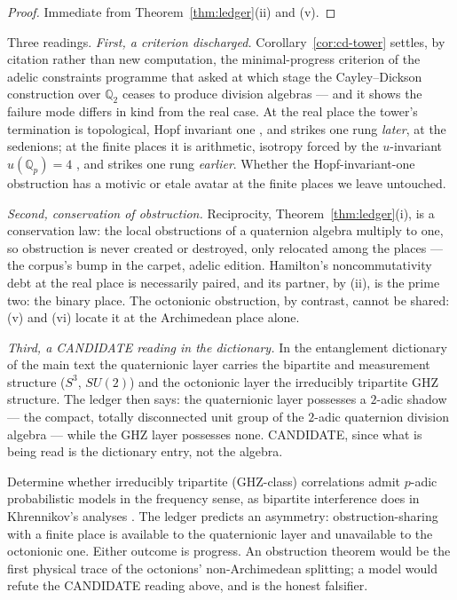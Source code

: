 \begin{proof}
Immediate from Theorem~\ref{thm:ledger}(ii) and (v).
\end{proof}

Three readings. \emph{First, a criterion discharged.}
Corollary~\ref{cor:cd-tower} settles, by citation rather than new computation, the
minimal-progress criterion of the adelic constraints programme that asked at which
stage the Cayley--Dickson construction over $\mathbb{Q}_2$ ceases to produce division
algebras --- and it shows the failure mode differs in kind from the real case. At the
real place the tower's termination is topological, Hopf invariant one
\autocite{adams1960}, and strikes one rung \emph{later}, at the sedenions; at the
finite places it is arithmetic, isotropy forced by the $u$-invariant
$u(\mathbb{Q}_p) = 4$ \autocite{lam2005, serre1973}, and strikes one rung
\emph{earlier}. Whether the Hopf-invariant-one obstruction has a motivic or etale
avatar at the finite places we leave untouched.

\emph{Second, conservation of obstruction.} Reciprocity, Theorem~\ref{thm:ledger}(i),
is a conservation law: the local obstructions of a quaternion algebra multiply to one,
so obstruction is never created or destroyed, only relocated among the places --- the
corpus's bump in the carpet, adelic edition. Hamilton's noncommutativity debt at the
real place is necessarily paired, and its partner, by (ii), is the prime two: the
binary place. The octonionic obstruction, by contrast, cannot be shared: (v) and (vi)
locate it at the Archimedean place alone.

\emph{Third, a CANDIDATE reading in the dictionary.} In the entanglement dictionary of
the main text the quaternionic layer carries the bipartite and measurement structure
($S^3$, $SU(2)$) and the octonionic layer the irreducibly tripartite GHZ structure.
The ledger then says: the quaternionic layer possesses a $2$-adic shadow --- the
compact, totally disconnected unit group of the $2$-adic quaternion division algebra
--- while the GHZ layer possesses none. CANDIDATE, since what is being read is the
dictionary entry, not the algebra.

\begin{openproblem}\label{op:padic-ghz}
Determine whether irreducibly tripartite (GHZ-class) correlations admit $p$-adic
probabilistic models in the frequency sense, as bipartite interference does in
Khrennikov's analyses \autocite{khrennikov2009}. The ledger predicts an asymmetry:
obstruction-sharing with a finite place is available to the quaternionic layer and
unavailable to the octonionic one. Either outcome is progress. An obstruction theorem
would be the first physical trace of the octonions' non-Archimedean splitting; a model
would refute the CANDIDATE reading above, and is the honest falsifier.
\end{openproblem}

